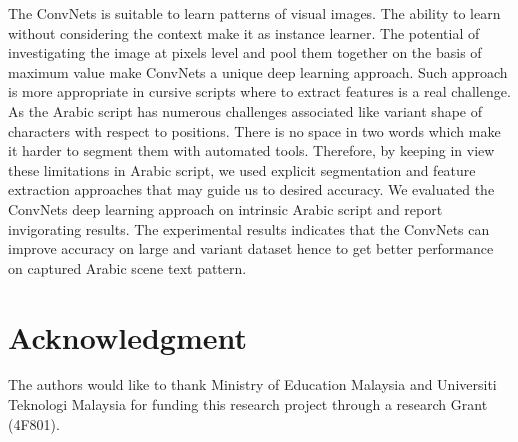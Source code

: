 \documentclass[conference]{IEEEtran}
\begin{document}
The ConvNets is suitable to learn patterns of visual images.
The ability to learn without considering the context make it as instance learner.
The potential of investigating the image at pixels level and pool them together on the basis of maximum value make ConvNets a unique deep learning approach.
Such approach is more appropriate in cursive scripts where to extract features is a real challenge.
As the Arabic script has numerous challenges associated like variant shape of characters with respect to positions.
There is no space in two words which make it harder to segment them with automated tools.
Therefore, by keeping in view these limitations in Arabic script, we used explicit segmentation and feature extraction approaches that may guide us to desired accuracy.
We evaluated the ConvNets deep learning approach on intrinsic Arabic script and report invigorating results.
The experimental results indicates that the ConvNets can improve accuracy on large and variant dataset hence to get better performance on captured Arabic scene text pattern.

\section*{Acknowledgment}
The authors would like to thank Ministry of Education Malaysia and Universiti Teknologi Malaysia for funding this research project through a research Grant (4F801).







\ifCLASSOPTIONcaptionsoff
  \newpage
\fi
\end{document}
